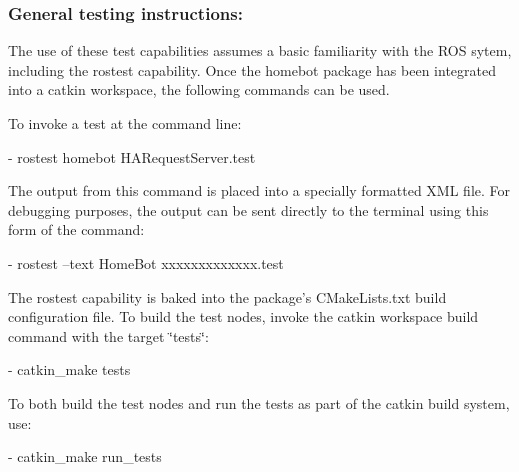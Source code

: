 \subsubsection*{General testing instructions\-:}

The use of these test capabilities assumes a basic familiarity with the R\-O\-S sytem, including the rostest capability. Once the homebot package has been integrated into a catkin workspace, the following commands can be used.

To invoke a test at the command line\-: \begin{DoxyVerb}- rostest homebot HARequestServer.test
\end{DoxyVerb}


The output from this command is placed into a specially formatted X\-M\-L file. For debugging purposes, the output can be sent directly to the terminal using this form of the command\-: \begin{DoxyVerb}- rostest --text HomeBot xxxxxxxxxxxxx.test
\end{DoxyVerb}


The rostest capability is baked into the package's C\-Make\-Lists.\-txt build configuration file. To build the test nodes, invoke the catkin workspace build command with the target \char`\"{}tests\char`\"{}\-: \begin{DoxyVerb}- catkin_make tests
\end{DoxyVerb}


To both build the test nodes and run the tests as part of the catkin build system, use\-: \begin{DoxyVerb}- catkin_make run_tests\end{DoxyVerb}
 